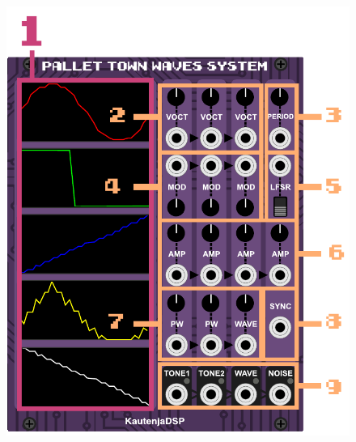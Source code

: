 \documentclass[12pt,letter]{article}
\begin{document}
\begin{figure}[!htp]
\centering
\includegraphics{Interface}
\end{figure}
\end{document}
